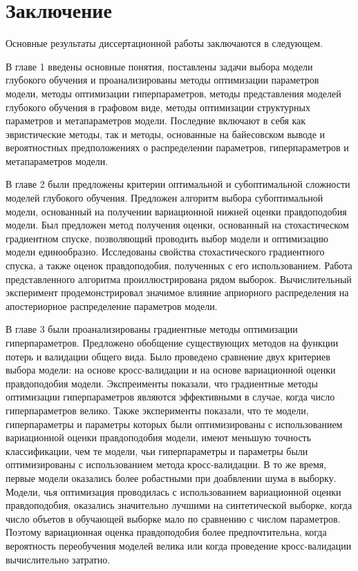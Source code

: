 
\chapter*{Заключение}
Основные результаты диссертационной работы заключаются в следующем.

В главе 1 введены основные понятия, поставлены задачи выбора модели глубокого обучения и проанализированы
методы оптимизации параметров модели, методы оптимизации гиперпараметров, методы представления моделей глубокого обучения в графовом виде, методы оптимизации структурных параметров и метапараметров модели. Последние включают в себя как эвристические методы, так и методы, основанные на байесовском выводе и вероятностных предположениях о распределении параметров, гиперпараметров и метапараметров модели.

В главе 2 были предложены критерии оптимальной и субоптимальной сложности моделей глубокого обучения. Предложен алгоритм выбора субоптимальной модели, основанный на получении вариационной нижней оценки  правдоподобия модели. Был предложен метод получения оценки, основанный на стохастическом градиентном спуске, позволяющий проводить выбор модели и оптимизацию модели единообразно. Исследованы свойства стохастического градиентного спуска, а также оценок правдоподобия, полученных с его использованием. 
Работа представленного алгоритма проиллюстрирована рядом выборок. 
Вычислительный эксперимент продемонстрировал значимое влияние априорного распределения на апостериорное распределение параметров модели. 

В главе 3 были проанализированы градиентные методы оптимизации гиперпараметров. Предложено обобщение существующих методов на функции потерь и валидации общего вида.
Было проведено сравнение двух критериев выбора модели: на основе кросс-валидации и на основе вариационной оценки правдоподобия модели.
Экспреименты показали, что градиентные методы оптимизации гиперпараметров являются эффективными в случае, когда число гиперпараметров велико. Также эксперименты показали, что те модели, гиперпараметры и параметры которых были оптимизированы с использованием вариационной оценки правдоподобия модели, имеют меньшую точность классификации, чем те модели, чьи гиперпараметры и параметры были оптимизированы с использованием метода кросс-валидации. В то же время, первые модели оказались более робастными при доабвлении шума в выборку. Модели, чья оптимизация проводилась с использованием вариационной оценки правдоподобия, оказались значительно лучшими на синтетической выборке, когда число объетов в обучающей выборке мало по сравнению с числом параметров. Поэтому вариационная оценка правдоподобия более предпочтительна, когда вероятность переобучения моделей велика или когда проведение кросс-валидации вычислительно затратно.

